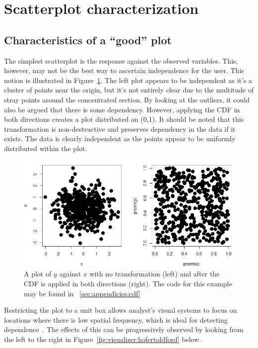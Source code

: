 \section{Scatterplot characterization}
\label{sec:visualizer:scatterplot}

\subsection{Characteristics of a ``good'' plot}
\label{sec:visualizer:scatterplot:goodplot}

The simplest scatterplot is the response against the observed variables. This,
however, may not be the best way to ascertain independence for the user. This
notion is illustrated in Figure~\ref{fig:visualizer:cdf}. The left plot appears
to be independent as it’s a cluster of points near the origin, but it's not
entirely clear due to the multitude of stray points around the concentrated
section. By looking at the outliers, it could also be argued that there is some
dependency. However, applying the CDF in both directions creates a plot
distributed on (0,1). It should be noted that this transformation is
non-destructive and preserves dependency in the data if it exists. The data is
clearly independent as the points appear to be uniformly distributed within the
plot.

\begin{figure}[htb]
	\begin{center}
		\includegraphics[width=0.75\linewidth]{ch-visualizer/figures/cdf}
		\caption[A plot of $y$ against $x$ after the CDF is applied in both
		directions.]{A plot of $y$ against $x$ with no transformation (left) 
		and after
			the CDF is applied in both directions (right). The code for this 
			example may be
			found in ~\ref{sec:appendicies:cdf}}
		\label{fig:visualizer:cdf}
	\end{center}
\end{figure}

Restricting the plot to a unit box allows analyst's visual systems to focus on
locations where there is low spatial frequency, which is ideal for detecting
dependence~\cite{hofert2016}. The effects of this can be progressively observed
by looking from the left to the right in
Figure~\ref{fig:visualizer:hofertoldford} below.


